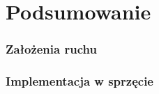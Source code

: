 \section{Podsumowanie}



\begin{frame}
    \frametitle{Założenia ruchu}
\end{frame}


\begin{frame}
    \frametitle{Implementacja w sprzęcie}
\end{frame}